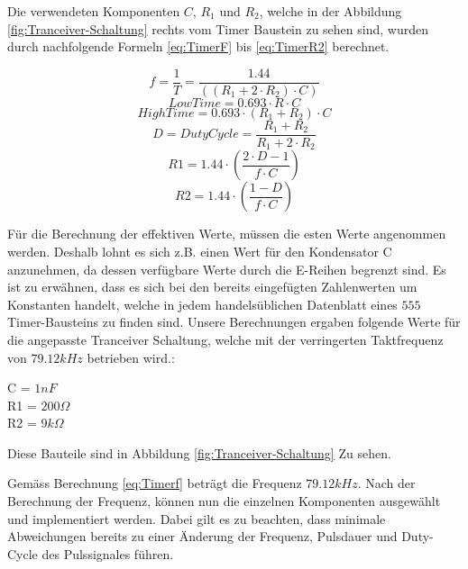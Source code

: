 Die verwendeten Komponenten $C$, $R_{1}$ und $R_{2}$, welche in der Abbildung  \ref{fig:Tranceiver-Schaltung} rechts vom Timer Baustein zu sehen sind, wurden durch nachfolgende Formeln \ref{eq:TimerF} bis \ref{eq:TimerR2} berechnet. 


\begin{equation}\label{eq:Timerf}
f= \dfrac{1}{T}= \dfrac{1.44}{((R_{1} + 2 \cdot R_{2})\cdot C)}
\end{equation}
\begin{equation}\label{eq:TimerTL}
LowTime= 0.693 \cdot R \cdot C
\end{equation}
\begin{equation}\label{eq:TimerTH}
HighTime= 0.693 \cdot (R_{1} + R_{2}) \cdot C
\end{equation}
\begin{equation}\label{eq:TimerDC}
D = DutyCycle = \dfrac{R_{1} + R_{2}}{R_{1} + 2 \cdot R_{2}}
\end{equation}
\begin{equation}\label{eq:TimerR1}
R1 = 1.44 \cdot \left( \dfrac{2 \cdot D - 1}{f \cdot C} \right)
\end{equation}
\begin{equation}\label{eq:TimerR2}
R2 = 1.44 \cdot \left( \dfrac{1-D}{f \cdot C} \right)
\end{equation} 


Für die Berechnung der effektiven Werte, müssen die esten Werte angenommen werden. Deshalb lohnt es sich z.B. einen Wert für den Kondensator C anzunehmen, da dessen verfügbare Werte  durch die E-Reihen begrenzt sind. Es ist zu erwähnen, dass es sich bei den bereits eingefügten Zahlenwerten um Konstanten handelt, welche in jedem handelsüblichen Datenblatt eines $555$ Timer-Bausteins zu finden sind. Unsere Berechnungen ergaben folgende Werte für die angepasste Tranceiver Schaltung, welche mit der verringerten Taktfrequenz von $79.12 kHz$ betrieben wird.:

\begin{center}
C = $1nF$\\
R1 = $200\Omega$\\
R2 = $9k\Omega$\\
\end{center}

Diese Bauteile sind in Abbildung \ref{fig:Tranceiver-Schaltung} Zu sehen.

 
Gemäss Berechnung \ref{eq:Timerf} beträgt die Frequenz $79.12kHz$. Nach der Berechnung der Frequenz, können nun die einzelnen Komponenten ausgewählt und implementiert werden. Dabei gilt es zu beachten, dass minimale Abweichungen bereits zu einer Änderung der Frequenz, Pulsdauer und Duty-Cycle des Pulssignales führen.

